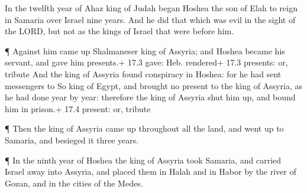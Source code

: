  In the twelfth year of Ahaz king of Judah began Hoshea the
son of Elah to reign in Samaria over Israel nine years.  And
he did that which was evil in the sight of the LORD, but not as the
kings of Israel that were before him.

 ¶ Against him came up Shalmaneser king of Assyria; and
Hoshea became his servant, and gave him presents.+ 17.3 gave: Heb.
rendered+ 17.3 presents: or, tribute  And the king of
Assyria found conspiracy in Hoshea: for he had sent messengers to So
king of Egypt, and brought no present to the king of Assyria, as he had
done year by year: therefore the king of Assyria shut him up, and bound
him in prison.+ 17.4 present: or, tribute

 ¶ Then the king of Assyria came up throughout all the land,
and went up to Samaria, and besieged it three years.

 ¶ In the ninth year of Hoshea the king of Assyria took
Samaria, and carried Israel away into Assyria, and placed them in Halah
and in Habor by the river of Gozan, and in the cities of the Medes.

